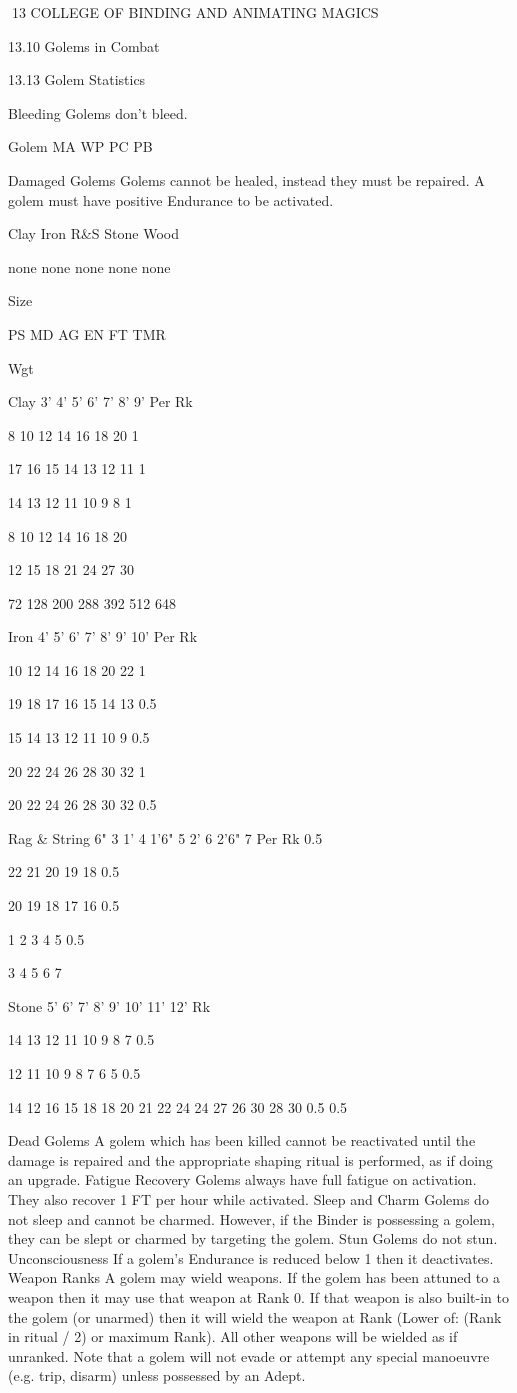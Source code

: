 \documentclass[a4paper]{article}
\begin{document}
\begin{multicols}{3}
13 COLLEGE OF BINDING AND ANIMATING MAGICS

13.10 Golems in Combat

13.13 Golem Statistics

Bleeding Golems don’t bleed.

Golem MA WP PC PB

Damaged Golems Golems cannot be healed, instead they must be repaired. A golem must have
positive Endurance to be activated.

Clay
Iron
R&S
Stone
Wood

none
none
none
none
none

Size

PS MD AG EN FT TMR

Wgt

Clay
3’
4’
5’
6’
7’
8’
9’
Per Rk

8
10
12
14
16
18
20
1

17
16
15
14
13
12
11
1

14
13
12
11
10
9
8
1

8
10
12
14
16
18
20

12
15
18
21
24
27
30

72
128
200
288
392
512
648

Iron
4’
5’
6’
7’
8’
9’
10’
Per Rk

10
12
14
16
18
20
22
1

19
18
17
16
15
14
13
0.5

15
14
13
12
11
10
9
0.5

20
22
24
26
28
30
32
1

20
22
24
26
28
30
32
0.5

Rag & String
6"
3
1’
4
1’6"
5
2’
6
2’6"
7
Per Rk 0.5

22
21
20
19
18
0.5

20
19
18
17
16
0.5

1
2
3
4
5
0.5

3
4
5
6
7

Stone
5’
6’
7’
8’
9’
10’
11’
12’
Rk

14
13
12
11
10
9
8
7
0.5

12
11
10
9
8
7
6
5
0.5

14 12
16 15
18 18
20 21
22 24
24 27
26 30
28 30
0.5 0.5

Dead Golems A golem which has been killed
cannot be reactivated until the damage is repaired
and the appropriate shaping ritual is performed, as
if doing an upgrade.
Fatigue Recovery Golems always have full fatigue
on activation. They also recover 1 FT per hour
while activated.
Sleep and Charm Golems do not sleep and cannot
be charmed. However, if the Binder is possessing a
golem, they can be slept or charmed by targeting
the golem.
Stun Golems do not stun.
Unconsciousness If a golem’s Endurance is reduced below 1 then it deactivates.
Weapon Ranks A golem may wield weapons. If
the golem has been attuned to a weapon then it
may use that weapon at Rank 0. If that weapon is
also built-in to the golem (or unarmed) then it will
wield the weapon at Rank (Lower of: (Rank in
ritual / 2) or maximum Rank). All other weapons
will be wielded as if unranked. Note that a golem
will not evade or attempt any special manoeuvre
(e.g. trip, disarm) unless possessed by an Adept.


\end{multicols}
\end{document}
